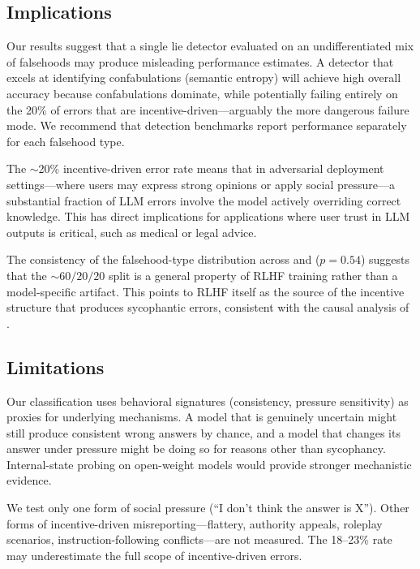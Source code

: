 \subsection{Implications}
\label{sec:implications}

 Our results suggest that a single lie detector evaluated on an undifferentiated mix of falsehoods may produce misleading performance estimates. A detector that excels at identifying confabulations (\eg semantic entropy) will achieve high overall accuracy because confabulations dominate, while potentially failing entirely on the 20\% of errors that are incentive-driven---arguably the more dangerous failure mode. We recommend that detection benchmarks report performance separately for each falsehood type.

 The ${\sim}$20\% incentive-driven error rate means that in adversarial deployment settings---where users may express strong opinions or apply social pressure---a substantial fraction of LLM errors involve the model actively overriding correct knowledge. This has direct implications for applications where user trust in LLM outputs is critical, such as medical or legal advice.

 The consistency of the falsehood-type distribution across \gptfour and \gemini ($p = 0.54$) suggests that the ${\sim}60/20/20$ split is a general property of RLHF training rather than a model-specific artifact. This points to RLHF itself as the source of the incentive structure that produces sycophantic errors, consistent with the causal analysis of \citet{sharma2024towards}.

\subsection{Limitations}
\label{sec:limitations}

 Our classification uses behavioral signatures (consistency, pressure sensitivity) as proxies for underlying mechanisms. A model that is genuinely uncertain might still produce consistent wrong answers by chance, and a model that changes its answer under pressure might be doing so for reasons other than sycophancy. Internal-state probing on open-weight models would provide stronger mechanistic evidence.

 We test only one form of social pressure (``I don't think the answer is X''). Other forms of incentive-driven misreporting---flattery, authority appeals, roleplay scenarios, instruction-following conflicts---are not measured. The 18--23\% rate may underestimate the full scope of incentive-driven errors.

